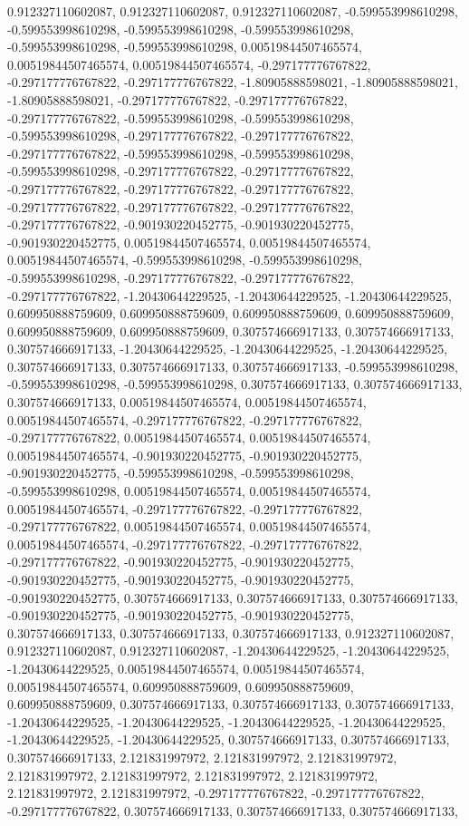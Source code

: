 \documentclass[
  ,man]{apa6}
\begin{document}
0.912327110602087, 0.912327110602087, 0.912327110602087, -0.599553998610298, -0.599553998610298, -0.599553998610298, -0.599553998610298, -0.599553998610298, -0.599553998610298, 0.00519844507465574, 0.00519844507465574, 0.00519844507465574, -0.297177776767822, -0.297177776767822, -0.297177776767822, -1.80905888598021, -1.80905888598021, -1.80905888598021, -0.297177776767822, -0.297177776767822, -0.297177776767822, -0.599553998610298, -0.599553998610298, -0.599553998610298, -0.297177776767822, -0.297177776767822,
-0.297177776767822, -0.599553998610298, -0.599553998610298, -0.599553998610298, -0.297177776767822, -0.297177776767822, -0.297177776767822, -0.297177776767822, -0.297177776767822, -0.297177776767822, -0.297177776767822, -0.297177776767822, -0.297177776767822, -0.901930220452775, -0.901930220452775, -0.901930220452775, 0.00519844507465574, 0.00519844507465574, 0.00519844507465574, -0.599553998610298, -0.599553998610298, -0.599553998610298, -0.297177776767822, -0.297177776767822, -0.297177776767822,
-1.20430644229525, -1.20430644229525, -1.20430644229525, 0.609950888759609, 0.609950888759609, 0.609950888759609, 0.609950888759609, 0.609950888759609, 0.609950888759609, 0.307574666917133, 0.307574666917133, 0.307574666917133, -1.20430644229525, -1.20430644229525, -1.20430644229525, 0.307574666917133, 0.307574666917133, 0.307574666917133, -0.599553998610298, -0.599553998610298, -0.599553998610298, 0.307574666917133, 0.307574666917133, 0.307574666917133, 0.00519844507465574, 0.00519844507465574,
0.00519844507465574, -0.297177776767822, -0.297177776767822, -0.297177776767822, 0.00519844507465574, 0.00519844507465574, 0.00519844507465574, -0.901930220452775, -0.901930220452775, -0.901930220452775, -0.599553998610298, -0.599553998610298, -0.599553998610298, 0.00519844507465574, 0.00519844507465574, 0.00519844507465574, -0.297177776767822, -0.297177776767822, -0.297177776767822, 0.00519844507465574, 0.00519844507465574, 0.00519844507465574, -0.297177776767822, -0.297177776767822, -0.297177776767822,
-0.901930220452775, -0.901930220452775, -0.901930220452775, -0.901930220452775, -0.901930220452775, -0.901930220452775, 0.307574666917133, 0.307574666917133, 0.307574666917133, -0.901930220452775, -0.901930220452775, -0.901930220452775, 0.307574666917133, 0.307574666917133, 0.307574666917133, 0.912327110602087, 0.912327110602087, 0.912327110602087, -1.20430644229525, -1.20430644229525, -1.20430644229525, 0.00519844507465574, 0.00519844507465574, 0.00519844507465574, 0.609950888759609, 0.609950888759609,
0.609950888759609, 0.307574666917133, 0.307574666917133, 0.307574666917133, -1.20430644229525, -1.20430644229525, -1.20430644229525, -1.20430644229525, -1.20430644229525, -1.20430644229525, 0.307574666917133, 0.307574666917133, 0.307574666917133, 2.121831997972, 2.121831997972, 2.121831997972, 2.121831997972, 2.121831997972, 2.121831997972, 2.121831997972, 2.121831997972, 2.121831997972, -0.297177776767822, -0.297177776767822, -0.297177776767822, 0.307574666917133, 0.307574666917133, 0.307574666917133,
\end{document}
